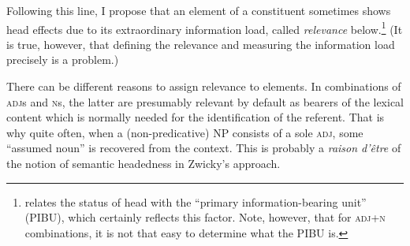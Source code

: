 \documentclass[output=paper
  ,nobabel
  ,draftmode
  ,colorlinks, citecolor=brown
]{langscibook}
\begin{document}
\noindent
Following this line, I propose that an element of a constituent sometimes shows head effects due to
its extraordinary information load, called \emph{relevance} below.\footnote{\textcite[257--259]{Croft1996, Croft2002} relates the status of head with the ``primary information-bearing unit'' (PIBU), which certainly reflects this factor. Note, however, that for \textsc{adj+n} combinations, it is not that easy to determine what the PIBU is.}
(It is true, however, that defining the relevance and measuring the information load precisely is a
problem.) 

There can be different reasons to assign relevance to elements. In combinations of \textsc{adj}s and
\textsc{n}s, the latter are presumably relevant by default as bearers of the lexical content which
is normally needed for the identification of the referent. That is why quite often, when a
(non-predicative) NP consists of a sole \textsc{adj}, some ``assumed noun'' is recovered from the
context. This is probably a \emph{raison d’être} of the notion of semantic headedness in Zwicky’s
approach. 
\end{document}
